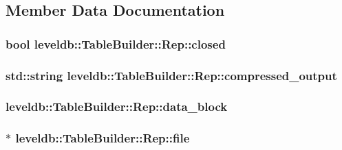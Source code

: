 \subsection{Member Data Documentation}
\hypertarget{structleveldb_1_1_table_builder_1_1_rep_a5324550d58b999bcea173b1c21060138}{
\subsubsection[{closed}]{\setlength{\rightskip}{0pt plus 5cm}bool leveldb\-::\-Table\-Builder\-::\-Rep\-::closed}}\label{structleveldb_1_1_table_builder_1_1_rep_a5324550d58b999bcea173b1c21060138}
\hypertarget{structleveldb_1_1_table_builder_1_1_rep_ae299e513afc71a8474c303b25aaadb08}{
\subsubsection[{compressed\-\_\-output}]{\setlength{\rightskip}{0pt plus 5cm}std\-::string leveldb\-::\-Table\-Builder\-::\-Rep\-::compressed\-\_\-output}}\label{structleveldb_1_1_table_builder_1_1_rep_ae299e513afc71a8474c303b25aaadb08}
\hypertarget{structleveldb_1_1_table_builder_1_1_rep_a6bef8b1271d88ec2d38aa7a0f9ae8a24}{
\subsubsection[{data\-\_\-block}]{ leveldb\-::\-Table\-Builder\-::\-Rep\-::data\-\_\-block}}\label{structleveldb_1_1_table_builder_1_1_rep_a6bef8b1271d88ec2d38aa7a0f9ae8a24}
\hypertarget{structleveldb_1_1_table_builder_1_1_rep_a3c33014db181b382785784cf0864f92b}{
\subsubsection[{file}]{$\ast$ leveldb\-::\-Table\-Builder\-::\-Rep\-::file}}\label{structleveldb_1_1_table_builder_1_1_rep_a3c33014db181b382785784cf0864f92b}
